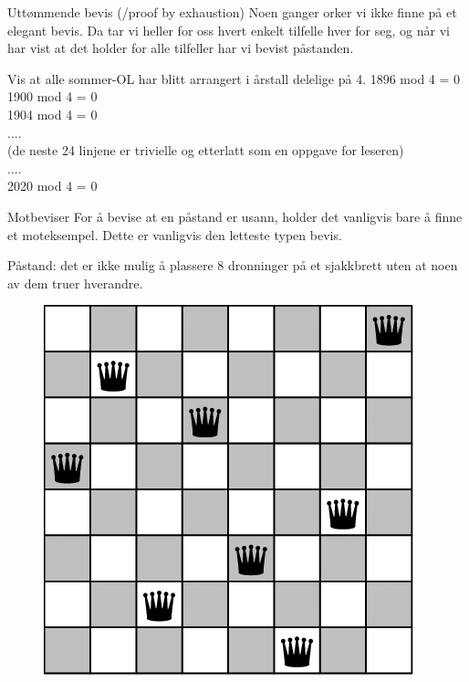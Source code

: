 \begin{frame}{Uttømmende bevis (/proof by exhaustion)}
    Noen ganger orker vi ikke finne på et elegant bevis. Da tar vi heller for oss hvert enkelt tilfelle hver for seg, og når vi har vist at det holder for alle tilfeller har vi bevist påstanden. \\
    
    \begin{block}{Vis at alle sommer-OL har blitt arrangert i årstall delelige på 4.}
        1896 mod 4 = 0 \checkmark \\
        1900 mod 4 = 0 \checkmark \\
        1904 mod 4 = 0 \checkmark \\
        .... \\
        (de neste 24 linjene er trivielle og etterlatt som en oppgave for leseren)\\
        ....\\
        2020 mod 4 = 0 \checkmark
    \end{block}
\end{frame}

\begin{frame}{Motbeviser}
    For å bevise at en påstand er usann, holder det vanligvis bare å finne et moteksempel. Dette er vanligvis den letteste typen bevis.
    
    \begin{block}{Påstand: det er ikke mulig å plassere 8 dronninger på et sjakkbrett uten at noen av dem truer hverandre.}
    \begin{figure}
        \centering
        \includegraphics[scale=0.20]{8 queens.png}
        \label{fig:my_label}
    \end{figure}
    
    \end{block}
\end{frame}

